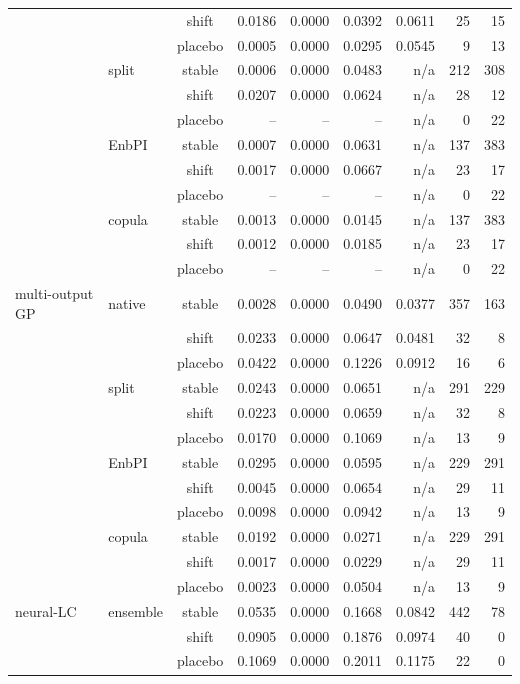 {\begin{longtable}{@{}llcrrrrrr@{}}
 &  & shift & 0.0186 & 0.0000 & 0.0392 & 0.0611 & 25 & 15 \\
 &  & placebo & 0.0005 & 0.0000 & 0.0295 & 0.0545 & 9 & 13 \\
 & split & stable & 0.0006 & 0.0000 & 0.0483 & n/a & 212 & 308 \\
 &  & shift & 0.0207 & 0.0000 & 0.0624 & n/a & 28 & 12 \\
 &  & placebo & -- & -- & -- & n/a & 0 & 22 \\
 & EnbPI & stable & 0.0007 & 0.0000 & 0.0631 & n/a & 137 & 383 \\
 &  & shift & 0.0017 & 0.0000 & 0.0667 & n/a & 23 & 17 \\
 &  & placebo & -- & -- & -- & n/a & 0 & 22 \\
 & copula & stable & 0.0013 & 0.0000 & 0.0145 & n/a & 137 & 383 \\
 &  & shift & 0.0012 & 0.0000 & 0.0185 & n/a & 23 & 17 \\
 &  & placebo & -- & -- & -- & n/a & 0 & 22 \\
\addlinespace[2pt]
multi-output GP & native & stable & 0.0028 & 0.0000 & 0.0490 & 0.0377 & 357 & 163 \\
 &  & shift & 0.0233 & 0.0000 & 0.0647 & 0.0481 & 32 & 8 \\
 &  & placebo & 0.0422 & 0.0000 & 0.1226 & 0.0912 & 16 & 6 \\
 & split & stable & 0.0243 & 0.0000 & 0.0651 & n/a & 291 & 229 \\
 &  & shift & 0.0223 & 0.0000 & 0.0659 & n/a & 32 & 8 \\
 &  & placebo & 0.0170 & 0.0000 & 0.1069 & n/a & 13 & 9 \\
 & EnbPI & stable & 0.0295 & 0.0000 & 0.0595 & n/a & 229 & 291 \\
 &  & shift & 0.0045 & 0.0000 & 0.0654 & n/a & 29 & 11 \\
 &  & placebo & 0.0098 & 0.0000 & 0.0942 & n/a & 13 & 9 \\
 & copula & stable & 0.0192 & 0.0000 & 0.0271 & n/a & 229 & 291 \\
 &  & shift & 0.0017 & 0.0000 & 0.0229 & n/a & 29 & 11 \\
 &  & placebo & 0.0023 & 0.0000 & 0.0504 & n/a & 13 & 9 \\
\addlinespace[2pt]
neural-LC & ensemble & stable & 0.0535 & 0.0000 & 0.1668 & 0.0842 & 442 & 78 \\
 &  & shift & 0.0905 & 0.0000 & 0.1876 & 0.0974 & 40 & 0 \\
 &  & placebo & 0.1069 & 0.0000 & 0.2011 & 0.1175 & 22 & 0 \\

\end{longtable}}
